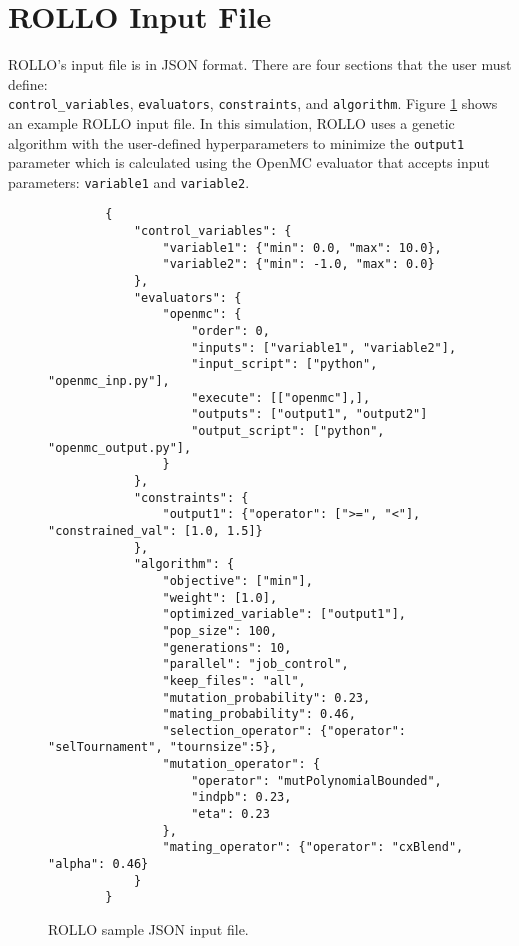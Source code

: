 \section{ROLLO Input File}
\gls{ROLLO}'s input file is in JSON format. 
There are four sections that the user must define: \\ \texttt{control\_variables}, 
\texttt{evaluators}, \texttt{constraints}, and \texttt{algorithm}. 
Figure \ref{fig:rollo-input} shows an example \gls{ROLLO} input file. 
In this simulation, \gls{ROLLO} uses a genetic algorithm with the user-defined 
hyperparameters to minimize the \texttt{output1} parameter which is 
calculated using the OpenMC evaluator that accepts input parameters: 
\texttt{variable1} and \texttt{variable2}. 
\begin{figure}[]
    \begin{verbatim}
        {
            "control_variables": {
                "variable1": {"min": 0.0, "max": 10.0}, 
                "variable2": {"min": -1.0, "max": 0.0}
            }, 
            "evaluators": {
                "openmc": {
                    "order": 0,
                    "inputs": ["variable1", "variable2"],
                    "input_script": ["python", "openmc_inp.py"],
                    "execute": [["openmc"],],
                    "outputs": ["output1", "output2"]
                    "output_script": ["python", "openmc_output.py"], 
                }
            }, 
            "constraints": {
                "output1": {"operator": [">=", "<"], "constrained_val": [1.0, 1.5]}
            }, 
            "algorithm": {
                "objective": ["min"], 
                "weight": [1.0],
                "optimized_variable": ["output1"], 
                "pop_size": 100, 
                "generations": 10, 
                "parallel": "job_control",
                "keep_files": "all",
                "mutation_probability": 0.23,
                "mating_probability": 0.46,
                "selection_operator": {"operator": "selTournament", "tournsize":5},
                "mutation_operator": {
                    "operator": "mutPolynomialBounded",
                    "indpb": 0.23,
                    "eta": 0.23
                },
                "mating_operator": {"operator": "cxBlend", "alpha": 0.46}
            }
        }
    \end{verbatim}
    \caption{\acrfull{ROLLO} sample JSON input file.}
    \label{fig:rollo-input}
\end{figure}

